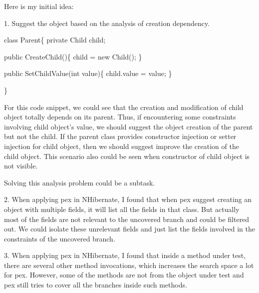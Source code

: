Here is my initial idea:

1. Suggest the object based on the analysis of creation dependency.

\begin{scriptsize}
class Parent\{                                            
private Child child;                                      

public CreateChild()\{                              
	child = new Child();                                               
\}

public SetChildValue(int value)\{                              
	child.value = value;                                              
\}

\}

\end{scriptsize} 

For this code snippet, we could see that the creation and modification of child object totally depends on its parent. Thus, if encountering some constraints involving child object's value, we should suggest the object creation of the parent but not the child. If the parent class provides constructor injection or setter injection for child object, then we should suggest improve the creation of the child object. This scenario also could be seen when constructor of child object is not visible.

Solving this analysis problem could be a subtask.

2. When applying pex in NHibernate, I found that when pex suggest creating an object with multiple fields, it will list all the fields in that class. But actually most of the fields are not relevant to the uncovered branch and could be filtered out. We could isolate these unrelevant fields and just list the fields involved in the constraints of the uncovered branch.

3. When applying pex in NHibernate, I found that inside a method under test, there are several other method invocations, which increases the search space a lot for pex. However, some of the methods are not from the object under test and pex still tries to cover all the branches inside such methods. 

